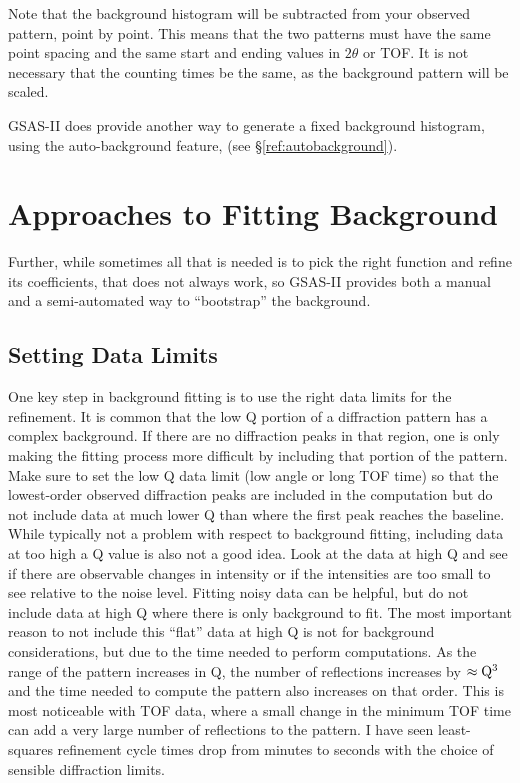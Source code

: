 Note that the background histogram will be subtracted from your observed pattern, point by point. This means that the two patterns must have the same point spacing and the same start and ending values in $2\theta$ or TOF. It is not necessary that the counting times be the same, as the background pattern will be scaled.  

GSAS-II does provide another way to generate a fixed background histogram, using the auto-background feature, (see \S\ref{ref:autobackground}). 

\section{Approaches to Fitting Background}\label{ref:backgroundfit}

 Further, while sometimes all that is needed is to pick the right function and refine its coefficients, that does not always work, so GSAS-II provides both a manual and a semi-automated way to ``bootstrap'' the background. 

\subsection{Setting Data Limits}
One key step in background fitting is to use the right data limits for the refinement. It is common that the low Q portion of a diffraction pattern has a complex background. If there are no diffraction peaks in that region, one is only making the fitting process more difficult by including that portion of the pattern. Make sure to set the low Q data limit (low angle or long TOF time) so that the lowest-order observed diffraction peaks are included in the computation but do not include data at much lower Q than where the first peak reaches the baseline. While typically not a problem with respect to background fitting, including data at too high a Q value is also not a good idea. Look at the data at high Q and see if there are observable changes in intensity or if the intensities are too small to see relative to the noise level. Fitting noisy data can be helpful, but do not include data at high Q where there is only background to fit. The most important reason to not include this ``flat''  data at high Q is not for background considerations, but due to the time needed to perform computations. As the range of the pattern increases in Q, the number of reflections increases by $\approx\rm Q^3$ and the time needed to compute the pattern also increases on that order. This is most noticeable with TOF data, where a small change in the minimum TOF time can add a very large number of reflections to the pattern. I have seen least-squares refinement cycle times drop from minutes to seconds with the choice of sensible diffraction limits. 

